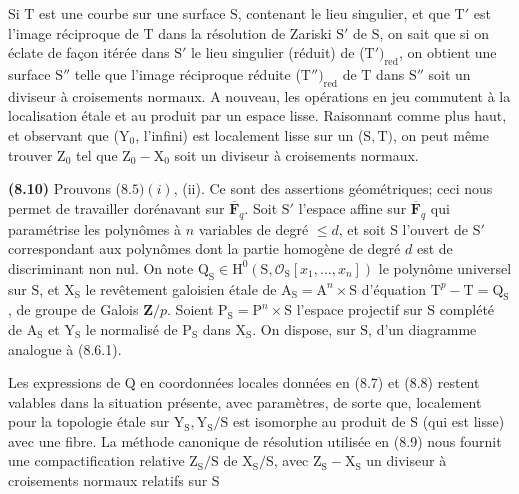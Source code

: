 \documentclass[10pt,leqno]{article}
\begin{document}
\clearpage

\label{physical-34}

\noindent Si \(\mathrm{T}\) est une courbe sur une surface \(\mathrm{S}\), contenant le lieu singulier, et que \(\mathrm{T}'\) est l'image réciproque de \(\mathrm{T}\) dans la résolution de Zariski \(\mathrm{S}'\) de \(\mathrm{S}\), on sait que si on éclate de façon itérée dans \(\mathrm{S}'\) le lieu singulier (réduit) de (\(\mathrm{T}')_{\mathrm{red}}\), on obtient une surface \(\mathrm{S}''\) telle que l'image réciproque réduite (\(\mathrm{T}'')_{\mathrm{red}}\) de \(\mathrm{T}\) dans \(\mathrm{S}''\) soit un diviseur à croisements normaux. \(\mathrm{A}\) nouveau, les opérations en jeu commutent à la localisation étale et au produit par un espace lisse. Raisonnant comme plus haut, et observant que (\(\mathrm{Y}_{0}\), l'infini) est localement lisse sur un (\(\mathrm{S},\mathrm{T})\), on peut même trouver \(\mathrm{Z}_{0}\) tel que \(\mathrm{Z}_{0}-\mathrm{X}_{0}\) soit un diviseur à croisements normaux.\par

\noindent \textbf{(8.10)} Prouvons (\(8.5) (i)\), (ii). Ce sont des assertions géométriques; ceci nous permet de travailler dorénavant sur \(\overline{\mathbf{F}}_{q}\). Soit \(\mathrm{S}'\) l'espace affine sur \(\overline{\mathbf{F}}_{q}\) qui paramétrise les polynômes à \(n\) variables de degré \(\leq  d\), et soit \(\mathrm{S}\) l'ouvert de \(\mathrm{S}'\) correspondant aux polynômes dont la partie homogène de degré \(d\) est de discriminant non nul. On note \(\mathrm{Q}_{\mathrm{S}} \in  \mathrm{H}^{0}(\mathrm{S},\mathcal{O}_{\mathrm{S}}[x_{1},\ldots ,x_{n}])\) le polynôme universel sur \(\mathrm{S}\), et \(\mathrm{X}_{\mathrm{S}}\) le revêtement galoisien étale de \(\mathrm{A}_{\mathrm{S}} = \mathrm{A}^{n} \times  \mathrm{S}\) d'équation \(\mathrm{T}^{p}-\mathrm{T} = \mathrm{Q}_{\mathrm{S}}\), de groupe de Galois \(\mathbf{Z}/p\). Soient \(\mathrm{P}_{\mathrm{S}} = \mathrm{P}^{n} \times  \mathrm{S}\) l'espace projectif sur \(\mathrm{S}\) complété de \(\mathrm{A}_{\mathrm{S}}\) et \(\mathrm{Y}_{\mathrm{S}}\) le normalisé de \(\mathrm{P}_{\mathrm{S}}\) dans \(\mathrm{X}_{\mathrm{S}}\). On dispose, sur \(\mathrm{S}\), d'un diagramme analogue à (8.6.1).\par

\noindent Les expressions de \(\mathrm{Q}\) en coordonnées locales données en (8.7) et (8.8) restent valables dans la situation présente, avec paramètres, de sorte que, localement pour la topologie étale sur \(\mathrm{Y}_{\mathrm{S}}, \mathrm{Y}_{\mathrm{S}}/\mathrm{S}\) est isomorphe au produit de \(\mathrm{S}\) (qui est lisse) avec une fibre. La méthode canonique de résolution utilisée en (8.9) nous fournit une compactification relative \(\mathrm{Z}_{\mathrm{S}}/\mathrm{S}\) de \(\mathrm{X}_{\mathrm{S}}/\mathrm{S}\), avec \(\mathrm{Z}_{\mathrm{S}}-\mathrm{X}_{\mathrm{S}}\) un diviseur à croisements normaux relatifs sur \(\mathrm{S}\)\par
\end{document}
